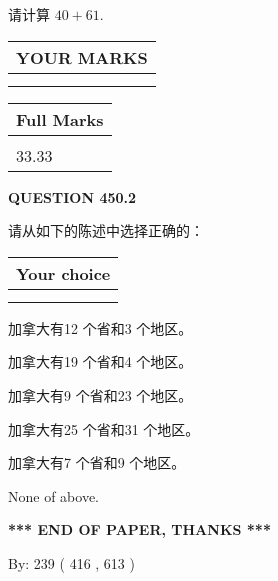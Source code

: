 \documentclass{ctexart}
\begin{document}
  
 
请计算 $ %
40 +  %
61 $.
 

 

 
  
\vspace{0.2in}
  
\noindent\begin{tabular}{|l|}
\hline
 YOUR MARKS  \\
\hline
 \\ 
 \\ 
\hline
\end{tabular}
\hspace{0.05in} \begin{tabular}{|l|}
\hline
 Full Marks  \\
\hline
 \\ 
33.33 \\
\hline
\end{tabular}
{\textbf{\Large{QUESTION
450.2 
}}}
  
  
请从如下的陈述中选择正确的：
  
  
\noindent\hspace{3.0in} \begin{tabular}{|l|}
\hline
Your choice \\
\hline
 \\ 
 \\ 
\hline
\end{tabular}
  
  
 
 
加拿大有12 个省和3 个地区。
 
 
加拿大有19 个省和4 个地区。
 
 
加拿大有9 个省和23 个地区。
 
 
加拿大有25 个省和31 个地区。
 
 
加拿大有7 个省和9 个地区。
 
 
 None of above.
 
 
   
   
 \vspace{0.2in}
 
   
   
   
   
\vspace{1.0in} 
{\textbf{\large{ *** END OF PAPER, THANKS *** }}} 
   
   
\hspace{1.0in} By: 
 239 ( 416 ,  613 )
   
\end{document}
